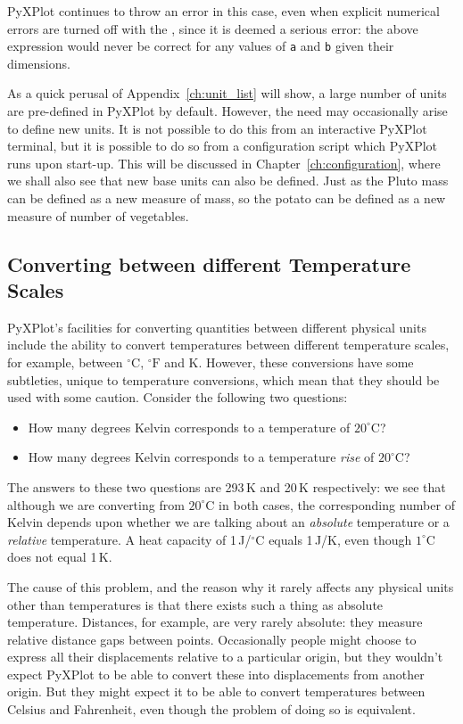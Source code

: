 \noindent PyXPlot continues to throw an error in this case, even when explicit
numerical errors are turned off with the ,
since it is deemed a serious error: the above expression would never be correct
for any values of {\tt a} and {\tt b} given their dimensions.

As a quick perusal of Appendix~\ref{ch:unit_list} will show, a large number of
units are pre-defined in PyXPlot by default. However, the need may occasionally
arise to define new units. It is not possible to do this from an interactive
PyXPlot terminal, but it is possible to do so from a configuration script which
PyXPlot runs upon start-up. This will be discussed in
Chapter~\ref{ch:configuration}, where we shall also see that new base units can
also be defined. Just as the Pluto mass can be defined as a new measure of
mass, so the potato can be defined as a new measure of number of vegetables.

\subsection{Converting between different Temperature Scales}

PyXPlot's facilities for converting quantities between different physical units
include the ability to convert temperatures between different temperature
scales, for example, between $^\circ\mathrm{C}$, $^\circ\mathrm{F}$ and K.
However, these conversions have some subtleties, unique to temperature
conversions, which mean that they should be used with some caution. Consider
the following two questions:
\begin{itemize}
\item How many degrees Kelvin corresponds to a temperature of $20^\circ$C?
\item How many degrees Kelvin corresponds to a temperature {\it rise} of $20^\circ$C?
\end{itemize}
The answers to these two questions are 293\,K and 20\,K respectively: we see
that although we are converting from $20^\circ$C in both cases, the
corresponding number of Kelvin depends upon whether we are talking about an
{\it absolute} temperature or a {\it relative} temperature. A heat capacity of
1\,J/$^\circ$C equals 1\,J/K, even though $1^\circ$C does not equal 1\,K.

The cause of this problem, and the reason why it rarely affects any physical
units other than temperatures is that there exists such a thing as absolute
temperature. Distances, for example, are very rarely absolute: they measure
relative distance gaps between points. Occasionally people might choose to
express all their displacements relative to a particular origin, but they
wouldn't expect PyXPlot to be able to convert these into displacements from
another origin. But they might expect it to be able to convert temperatures
between Celsius and Fahrenheit, even though the problem of doing so is
equivalent.

